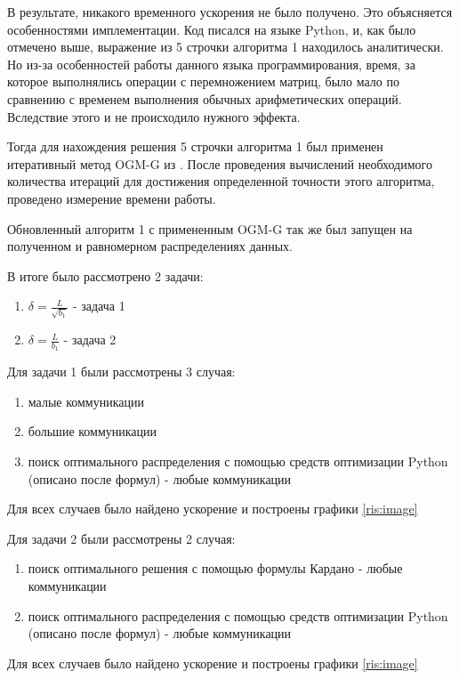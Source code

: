 \documentclass{article}
\begin{document}
В результате, никакого временного ускорения не было получено. Это объясняется особенностями имплементации. Код писался на языке Python, и, как было отмечено выше, выражение из 5 строчки алгоритма 1 находилось аналитически. Но из-за особенностей работы данного языка программирования, время, за которое выполнялись операции с перемножением матриц, было мало по сравнению с временем выполнения обычных арифметических операций. Вследствие этого и не происходило нужного эффекта.

Тогда для нахождения решения 5 строчки алгоритма 1 был применен итеративный метод OGM-G из \cite{kim2021optimizing}. После проведения вычислений необходимого количества итераций для достижения определенной точности этого алгоритма, проведено измерение времени работы.

Обновленный алгоритм 1 с примененным OGM-G так же был запущен на полученном и равномерном распределениях данных.

В итоге было рассмотрено 2 задачи: 
\begin{enumerate}
    \item $\delta = \frac{L}{\sqrt{b_1}}$ - задача 1
    \item $\delta = \frac{L}{b_1}$ - задача 2
\end{enumerate}

Для задачи 1 были рассмотрены 3 случая:
\begin{enumerate}
    \item малые коммуникации
    \item большие коммуникации
    \item поиск оптимального распределения с помощью средств оптимизации Python (описано после формул) - любые коммуникации
\end{enumerate}

Для всех случаев было найдено ускорение и построены графики \ref{ris:image}

Для задачи 2 были рассмотрены 2 случая:
\begin{enumerate}
    \item поиск оптимального решения с помощью формулы Кардано - любые коммуникации
    \item поиск оптимального распределения с помощью средств оптимизации Python (описано после формул) - любые коммуникации
\end{enumerate}

Для всех случаев было найдено ускорение и построены графики \ref{ris:image}
\end{document}
